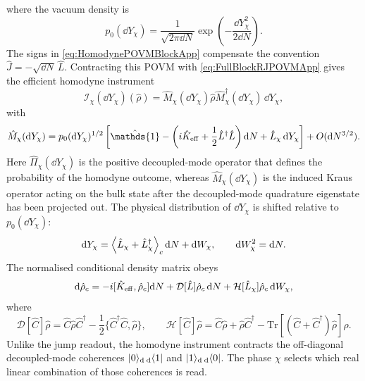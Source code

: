 \documentclass{article}
\newcommand{\openone}{\hat{\mathds{1}}}
\def\Tr{\mathrm{Tr}}
\numberwithin{equation}{section}
\begin{document}
	where the vacuum density is
	\begin{equation}
		p_0(\dd Y_\chi) = \frac{1}{\sqrt{2\pi \dd N}} \exp\!\left( -\frac{\dd Y_\chi^2}{2\dd N} \right).
		\label{eq:HomodyneOstensibleApp}
	\end{equation}
	The signs in \cref{eq:HomodynePOVMBlockApp} compensate the convention \(\hat J=-\sqrt{\dd N}\,\hat L\). Contracting this POVM with \cref{eq:FullBlockRJPOVMApp} gives the efficient homodyne instrument
	\begin{equation}
		\mathcal I_\chi(\dd Y_\chi)(\hat\rho) = \hat M_\chi(\dd Y_\chi)\hat\rho \hat M_\chi^\dagger(\dd Y_\chi)\,\dd Y_\chi,
		\label{eq:HomodyneInstrumentApp}
	\end{equation}
	with
	\begin{equation}
		\hat M_\chi(\dd Y_\chi) = p_0(\dd Y_\chi)^{1/2} \left[ \openone - \left( i\hat K_{\rm eff} + \frac12\hat L^\dagger\hat L \right)\dd N + \hat L_\chi\,\dd Y_\chi \right] + O(\dd N^{3/2}).
		\label{eq:HomodyneMeasurementOperatorApp}
	\end{equation}
	Here \(\hat\Pi_\chi(\dd Y_\chi)\) is the positive decoupled-mode operator that defines the probability of the homodyne outcome, whereas \(\hat M_\chi(\dd Y_\chi)\) is the induced Kraus operator acting on the bulk state after the decoupled-mode quadrature eigenstate has been projected out. The physical distribution of \(\dd Y_\chi\) is shifted relative to \(p_0(\dd Y_\chi)\):
	\begin{equation}
		\dd Y_\chi = \ev{\hat L_\chi+\hat L_\chi^\dagger}_c \dd N + \dd W_\chi, \qquad \dd W_\chi^2=\dd N .
		\label{eq:HomodyneRecordPOVMApp}
	\end{equation}
	The normalised conditional density matrix obeys
	\begin{equation}
		\dd\hat\rho_c = -i[\hat K_{\rm eff},\hat\rho_c]\dd N + \mathcal D[\hat L]\hat\rho_c\,\dd N + \mathcal H[\hat L_\chi]\hat\rho_c\,\dd W_\chi ,
		\label{eq:HomodyneSMEPOVMApp}
	\end{equation}
	where
	\begin{equation}
		\mathcal D[\hat C]\hat\rho = \hat C\hat\rho\hat C^\dagger - \frac12 \bigl\{ \hat C^\dagger\hat C,\hat\rho \bigr\}, \qquad \mathcal H[\hat C]\hat\rho = \hat C\hat\rho+\hat\rho\hat C^\dagger - \Tr\!\left[ (\hat C+\hat C^\dagger)\hat\rho \right]\hat\rho .
		\label{eq:DHDefinitionsPOVMApp}
	\end{equation}
	Unlike the jump readout, the homodyne instrument contracts the off-diagonal decoupled-mode coherences \(\ket{0}\!{}_{\rm d}\,{}_{\rm d}\!\bra{1}\) and \(\ket{1}\!{}_{\rm d}\,{}_{\rm d}\!\bra{0}\). The phase \(\chi\) selects which real linear combination of those coherences is read.
\end{document}
